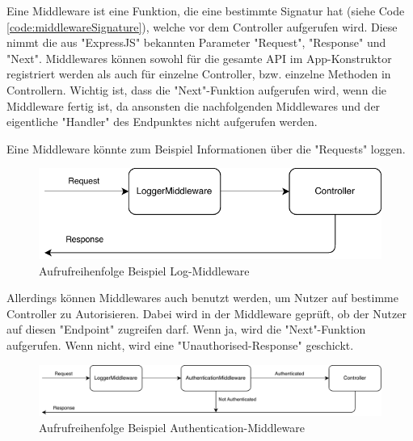 \label{sec:middleware}

Eine Middleware ist eine Funktion, die eine bestimmte Signatur hat (siehe Code \ref{code:middlewareSignature}), welche vor dem Controller aufgerufen wird. Diese nimmt die aus "ExpressJS" bekannten Parameter "Request", "Response" und "Next". Middlewares können sowohl für die gesamte API im App-Konstruktor registriert werden als auch für einzelne Controller, bzw. einzelne Methoden in Controllern. Wichtig ist, dass die "Next"-Funktion aufgerufen wird, wenn die Middleware fertig ist, da ansonsten die nachfolgenden Middlewares und der eigentliche "Handler" des Endpunktes nicht aufgerufen werden.


Eine Middleware könnte zum Beispiel Informationen über die "Requests" loggen. 

\begin{figure}[H]
    \centering
    \includegraphics{media/APITemplate/LogMiddleware.svg.pdf}
    \caption{Aufrufreihenfolge Beispiel Log-Middleware} 
\end{figure}

Allerdings können Middlewares auch benutzt werden, um Nutzer auf bestimme Controller zu Autorisieren. Dabei wird in der Middleware geprüft, ob der Nutzer auf diesen "Endpoint" zugreifen darf. Wenn ja, wird die "Next"-Funktion aufgerufen. Wenn nicht, wird eine "Unauthorised-Response" geschickt.

\begin{figure}[H]
    \centering
    \includegraphics[width=15cm]{media/APITemplate/AuthMiddleware.svg.pdf}
    \caption{Aufrufreihenfolge Beispiel Authentication-Middleware} 
\end{figure}